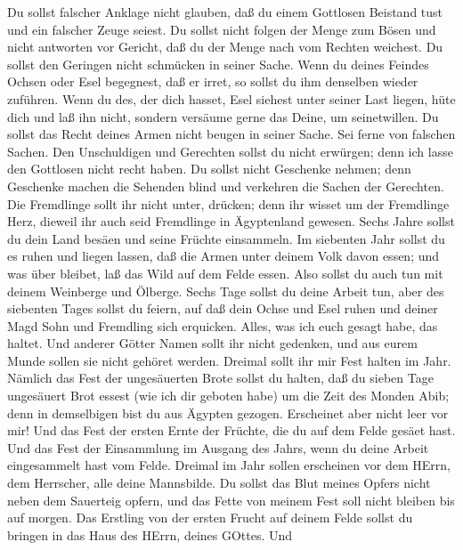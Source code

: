  Du sollst falscher Anklage nicht glauben, daß du einem
Gottlosen Beistand tust und ein falscher Zeuge seiest.  Du
sollst nicht folgen der Menge zum Bösen und nicht antworten vor Gericht,
daß du der Menge nach vom Rechten weichest.  Du sollst den
Geringen nicht schmücken in seiner Sache.  Wenn du deines
Feindes Ochsen oder Esel begegnest, daß er irret, so sollst du ihm
denselben wieder zuführen.  Wenn du des, der dich hasset,
Esel siehest unter seiner Last liegen, hüte dich und laß ihn nicht,
sondern versäume gerne das Deine, um seinetwillen.  Du
sollst das Recht deines Armen nicht beugen in seiner Sache. 
Sei ferne von falschen Sachen. Den Unschuldigen und Gerechten sollst du
nicht erwürgen; denn ich lasse den Gottlosen nicht recht haben.
 Du sollst nicht Geschenke nehmen; denn Geschenke machen die
Sehenden blind und verkehren die Sachen der Gerechten.  Die
Fremdlinge sollt ihr nicht unter, drücken; denn ihr wisset um der
Fremdlinge Herz, dieweil ihr auch seid Fremdlinge in Ägyptenland
gewesen.  Sechs Jahre sollst du dein Land besäen und seine
Früchte einsammeln.  Im siebenten Jahr sollst du es ruhen
und liegen lassen, daß die Armen unter deinem Volk davon essen; und was
über bleibet, laß das Wild auf dem Felde essen. Also sollst du auch tun
mit deinem Weinberge und Ölberge.  Sechs Tage sollst du
deine Arbeit tun, aber des siebenten Tages sollst du feiern, auf daß
dein Ochse und Esel ruhen und deiner Magd Sohn und Fremdling sich
erquicken.  Alles, was ich euch gesagt habe, das haltet.
Und anderer Götter Namen sollt ihr nicht gedenken, und aus eurem Munde
sollen sie nicht gehöret werden.  Dreimal sollt ihr mir
Fest halten im Jahr.  Nämlich das Fest der ungesäuerten
Brote sollst du halten, daß du sieben Tage ungesäuert Brot essest (wie
ich dir geboten habe) um die Zeit des Monden Abib; denn in demselbigen
bist du aus Ägypten gezogen. Erscheinet aber nicht leer vor mir!
 Und das Fest der ersten Ernte der Früchte, die du auf dem
Felde gesäet hast. Und das Fest der Einsammlung im Ausgang des Jahrs,
wenn du deine Arbeit eingesammelt hast vom Felde.  Dreimal
im Jahr sollen erscheinen vor dem HErrn, dem Herrscher, alle deine
Mannsbilde.  Du sollst das Blut meines Opfers nicht neben
dem Sauerteig opfern, und das Fette von meinem Fest soll nicht bleiben
bis auf morgen.  Das Erstling von der ersten Frucht auf
deinem Felde sollst du bringen in das Haus des HErrn, deines GOttes. Und

